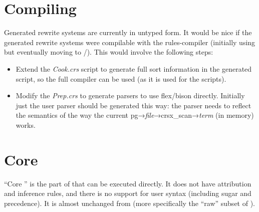 \documentclass[11pt]{article} %
\begin{document}
\section{Compiling}\label{sec:compiling}

Generated  rewrite systems are currently in untyped  form. It would be nice if the
generated rewrite systems were compilable with the \CRSX rules-compiler (initially using  but
eventually moving to /\hax). This would involve the following steps:
\begin{itemize}

\item Extend the \emph{Cook.crs} script to generate full sort information in the generated 
  script, so the  full compiler can be used (as it is used for the \HAX scripts).

\item Modify the \emph{Prep.crs} to generate parsers to use flex/bison directly. Initially just the
  user parser should be generated this way: the parser needs to reflect the semantics of the way the
  current pg→\emph{file}→crsx\_scan→\emph{term} (in memory) works.

\end{itemize}


\appendix\small

\section{Core \HAX}
\label{app:core}

``Core '' is the part of  that can be executed directly. It does not have attribution and
inference rules, and there is no support for user syntax (including sugar and precedence). It is
almost unchanged from  (more specifically the ``raw'' subset of ).
\end{document}
